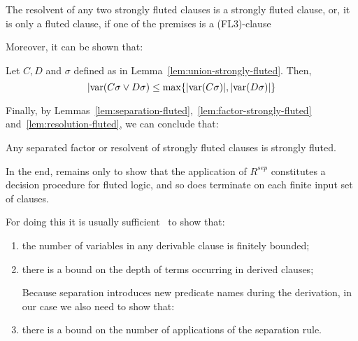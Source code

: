\begin{lemma}\label{lem:resolution-fluted}
  The resolvent of any two strongly fluted clauses is a strongly fluted clause, or, it is only a fluted clause, if one of the premises is a (FL3)-clause
\end{lemma}
Moreover, it can be shown that:

\begin{lemma}\label{lem:size-fluted}
  Let \(C,D\) and \(\sigma\) defined as in Lemma~\ref{lem:union-strongly-fluted}. Then,
  \[ |\text{var} (C\sigma \lor D\sigma) \leq \max\{ |\text{var} (C\sigma)|,|\text{var} (D\sigma)|\}\]
\end{lemma}
Finally, by Lemmas~\ref{lem:separation-fluted},~\ref{lem:factor-strongly-fluted} and~\ref{lem:resolution-fluted}, we can conclude that:
\begin{lemma}
  Any separated factor or resolvent of strongly fluted clauses is strongly fluted.
\end{lemma}
In the end, remains only to show that the application of \(R^{sep}\) constitutes a decision procedure for fluted logic, and so does terminate on each finite input set of clauses.

For doing this it is usually sufficient~\cite{joyner1976resolution} to show that:
\begin{enumerate}[label= (\roman*)]
  \item\label{item:bounded-variables} the number of variables in any derivable clause is finitely bounded;
  \item\label{item:bounded-depth} there is a bound on the depth of terms occurring in derived clauses;
  
  Because separation introduces new predicate names during the derivation, in our case we also need to show that:
  \item\label{item:bounded-separation} there is a bound on the number of applications of the separation rule.
\end{enumerate}

